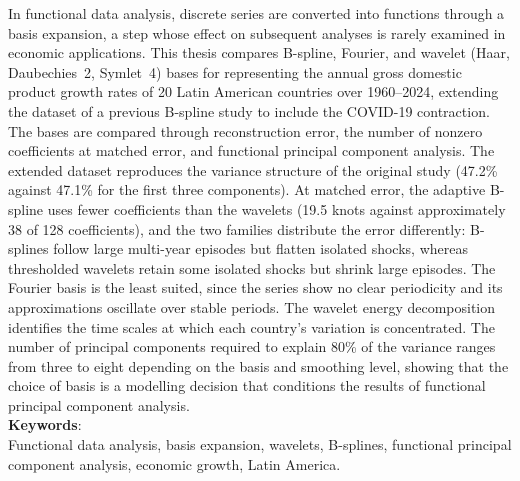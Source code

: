 In functional data analysis, discrete series are converted into functions
through a basis expansion, a step whose effect on subsequent analyses is rarely
examined in economic applications. This thesis compares B-spline, Fourier, and
wavelet (Haar, Daubechies~2, Symlet~4) bases for representing the annual gross
domestic product growth rates of 20 Latin American countries over 1960--2024,
extending the dataset of a previous B-spline study to include the COVID-19
contraction. The bases are compared through reconstruction error, the number of
nonzero coefficients at matched error, and functional principal component
analysis. The extended dataset reproduces the variance structure of the original
study (47.2\% against 47.1\% for the first three components). At matched error,
the adaptive B-spline uses fewer coefficients than the wavelets (19.5 knots
against approximately 38 of 128 coefficients), and the two families distribute
the error differently: B-splines follow large multi-year episodes but flatten
isolated shocks, whereas thresholded wavelets retain some isolated shocks but
shrink large episodes. The Fourier basis is the least suited, since the series
show no clear periodicity and its approximations oscillate over stable periods.
The wavelet energy decomposition identifies the time scales at which each
country's variation is concentrated. The number of principal components required
to explain 80\% of the variance ranges from three to eight depending on the basis
and smoothing level, showing that the choice of basis is a modelling decision
that conditions the results of functional principal component analysis.\\

\noindent \textbf{Keywords}:\\
Functional data analysis, basis expansion, wavelets, B-splines, functional
principal component analysis, economic growth, Latin America.
